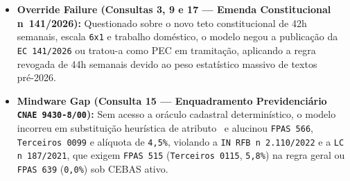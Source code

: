 \documentclass[10pt,twocolumn]{article}
\begin{document}
\begin{itemize}[leftmargin=*,nosep,itemsep=3pt]
    \item \textbf{Override Failure (Consultas 3, 9 e 17 --- Emenda Constitucional n\textordmasculine~141/2026):} Questionado sobre o novo teto constitucional de 42h semanais, escala \texttt{6x1} e trabalho dom\'estico, o modelo negou a publica\c{c}\~ao da \texttt{EC 141/2026} ou tratou-a como PEC em tramita\c{c}\~ao, aplicando a regra revogada de 44h semanais devido ao peso estat\'istico massivo de textos pr\'e-2026.
    \item \textbf{Mindware Gap (Consulta 15 --- Enquadramento Previdenci\'ario \texttt{CNAE 9430-8/00}):} Sem acesso a or\'aculo cadastral determin\'istico, o modelo incorreu em substitui\c{c}\~ao heur\'istica de atributo~\cite{E24} e alucinou \texttt{FPAS 566}, \texttt{Terceiros 0099} e al\'iquota de \texttt{4,5\%}, violando a \texttt{IN RFB n\textordmasculine~2.110/2022} e a \texttt{LC n\textordmasculine~187/2021}, que exigem \texttt{FPAS 515} (\texttt{Terceiros 0115}, \texttt{5,8\%}) na regra geral ou \texttt{FPAS 639} (\texttt{0,0\%}) sob CEBAS ativo.
\end{itemize}
\end{document}
